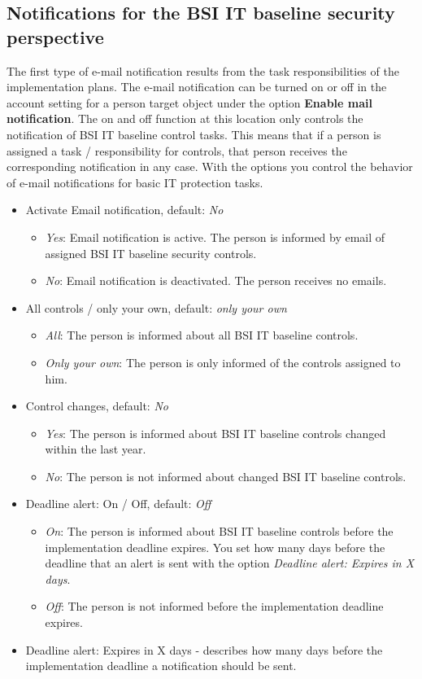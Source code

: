 \documentclass[a4paper,10pt]{book}
\begin{document}
\subsection{Notifications for the BSI IT baseline security perspective}
The first type of e-mail notification results from the task responsibilities of the implementation plans.
The e-mail notification can be turned on or off in the account setting for a person target object under the option  \textbf{Enable mail notification}. The on and off function at this location only controls the notification of BSI IT baseline control tasks. This means that if a person is assigned a task / responsibility for controls, that person receives the corresponding notification in any case. With the options you control the behavior of e-mail notifications for basic IT protection tasks.
\begin{itemize}
 \item Activate Email notification, default: {\em No}
  \begin{itemize}
   \item {\em Yes}: Email notification is active. The person is informed by email of assigned BSI IT baseline security controls.
   \item {\em No}: Email notification is deactivated. The person receives no emails.
  \end{itemize}
 \item All controls / only your own, default: {\em only your own}
  \begin{itemize}
   \item {\em All}: The person is informed about all BSI IT baseline controls.
   \item {\em Only your own}: The person is only informed of the controls assigned to him.
  \end{itemize}
 \item Control changes, default: {\em No}
  \begin{itemize}
   \item {\em Yes}: The person is informed about BSI IT baseline controls changed within the last year.
   \item {\em No}: The person is not informed about changed BSI IT baseline controls.
  \end{itemize}
 \item Deadline alert: On / Off, default: {\em Off}
  \begin{itemize}
   \item {\em On}: The person is informed about BSI IT baseline controls before the implementation deadline expires. You set how many days before the deadline that an alert is sent with the option {\em Deadline alert: Expires in X days}.
   \item {\em Off}: The person is not informed before the implementation deadline expires.
  \end{itemize}
 \item Deadline alert: Expires in X days - describes how many days before the implementation deadline a notification should be sent.
\end{itemize}
\end{document}
